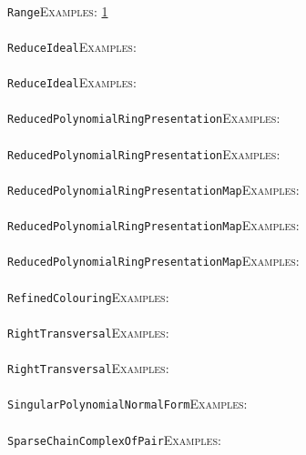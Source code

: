 \documentclass[a4paper,11pt]{report}
\begin{document}
{{ \\
 \texttt{Range}{\nobreakspace}{\nobreakspace}{\nobreakspace}{\nobreakspace}\textsc{Examples:} \href{../www/SideLinks/About/aboutTensorSquare.html} {1}{\nobreakspace} \\
 \\
 \texttt{ReduceIdeal}{\nobreakspace}{\nobreakspace}{\nobreakspace}{\nobreakspace}\textsc{Examples:} \\
 \\
 \texttt{ReduceIdeal}{\nobreakspace}{\nobreakspace}{\nobreakspace}{\nobreakspace}\textsc{Examples:} \\
 \\
 \texttt{ReducedPolynomialRingPresentation}{\nobreakspace}{\nobreakspace}{\nobreakspace}{\nobreakspace}\textsc{Examples:} \\
 \\
 \texttt{ReducedPolynomialRingPresentation}{\nobreakspace}{\nobreakspace}{\nobreakspace}{\nobreakspace}\textsc{Examples:} \\
 \\
 \texttt{ReducedPolynomialRingPresentationMap}{\nobreakspace}{\nobreakspace}{\nobreakspace}{\nobreakspace}\textsc{Examples:} \\
 \\
 \texttt{ReducedPolynomialRingPresentationMap}{\nobreakspace}{\nobreakspace}{\nobreakspace}{\nobreakspace}\textsc{Examples:} \\
 \\
 \texttt{ReducedPolynomialRingPresentationMap}{\nobreakspace}{\nobreakspace}{\nobreakspace}{\nobreakspace}\textsc{Examples:} \\
 \\
 \texttt{RefinedColouring}{\nobreakspace}{\nobreakspace}{\nobreakspace}{\nobreakspace}\textsc{Examples:} \\
 \\
 \texttt{RightTransversal}{\nobreakspace}{\nobreakspace}{\nobreakspace}{\nobreakspace}\textsc{Examples:} \\
 \\
 \texttt{RightTransversal}{\nobreakspace}{\nobreakspace}{\nobreakspace}{\nobreakspace}\textsc{Examples:} \\
 \\
 \texttt{SingularPolynomialNormalForm}{\nobreakspace}{\nobreakspace}{\nobreakspace}{\nobreakspace}\textsc{Examples:} \\
 \\
 \texttt{SparseChainComplexOfPair}{\nobreakspace}{\nobreakspace}{\nobreakspace}{\nobreakspace}\textsc{Examples:} \\
}}
\end{document}
